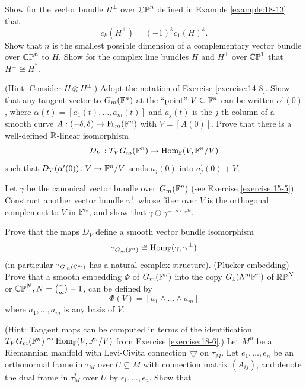 \begin{enumerate}[\theexercise.1]
  \NewItem Show for the vector bundle ${H}^{ \bot  }$ over ${\mathbb{{CP}}}^{n}$ defined in Example \ref{example:18-13} that
    \[
      {c}_{k}( {H}^{ \bot  })  = {(-1) }^{k}{c}_{1}{( H) }^{k}.
    \]
    Show that $n$ is the smallest possible dimension of a complementary vector bundle over ${\mathbb{{CP}}}^{n}$ to $H$.
  \NewItem Show for the complex line bundles $H$ and ${H}^{ \bot  }$ over ${\mathbb{{CP}}}^{1}$ that ${H}^{ \bot  } \cong  {H}^*$. \par(Hint: Consider $H \otimes  {H}^{ \bot  }$.)
  \NewItem Adopt the notation of Exercise \ref{exercise:14-8}. Show that any tangent vector to ${G}_{m}( {\mathbb{F}}^{n})$ at the ``point'' $V \subseteq  {\ensuremath{\mathbb{F}}}^{n}$ can be written ${\alpha }^{\prime }( 0)$, where $\alpha ( t)  = [  {{a}_{1}( t),\ldots,{a}_{m}( t) }]$ and ${a}_{j}( t)$ is the $j$-th column of a smooth curve $A : ( {-\delta,\delta })  \rightarrow  {\ensuremath{\mathrm{Fr}}}_{m}( {\mathbb{F}}^{n})$ with $V = [  {A( 0) }]$. Prove that there is a well-defined ${\mathbb{R}}$-linear isomorphism
    \[
      {D}_{V} : {T}_{V}{G}_{m}( {\mathbb{F}}^{n})  \rightarrow  {\ensuremath{\mathrm{Hom}}}_{\mathbb{F}}( {V,{\mathbb{F}}^{n}/V})
    \]
    such that ${D}_{V}( {{\alpha }^{\prime }( 0) })\colon V \rightarrow  {\ensuremath{\mathbb{F}}}^{n}/V$ sends ${a}_{j}( 0)$ into ${a}_{j}^{\prime }( 0)  + V$.\par
    Let $\gamma$ be the canonical vector bundle over ${G}_{m}( {\mathbb{F}}^{n})$ (see Exercise \ref{exercise:15-5}). Construct another vector bundle ${\gamma }^{ \bot  }$ whose fiber over $V$ is the orthogonal complement to $V$ in ${\mathbb{F}}^{n}$, and show that $\gamma  \oplus  {\gamma }^{ \bot  } \cong  {\varepsilon }^{n}$.\par
    Prove that the maps ${D}_{V}$ define a smooth vector bundle isomorphism
    \[
      {\tau }_{{G}_{m}( {\mathbb{F}}^{n}) } \cong  {\ensuremath{\mathrm{Hom}}}_{\mathbb{F}}( {\gamma,{\gamma }^{ \bot  }})
    \]
    (in particular ${\tau }_{{G}_{m}( {\mathbb{C}}^{m}) }$ has a natural complex structure).
  \NewItem (Pl\"ucker embedding) Prove that a smooth embedding $\Phi$ of ${G}_{m}( {\mathbb{F}}^{n})$ into the copy ${G}_{1}( {{\Lambda }^{m}{\mathbb{F}}^{n}})$ of ${\mathbb{{RP}}}^{N}$ or ${\mathbb{{CP}}}^{N},N = \binom{n}{m} - 1$, can be defined by
    \[
      \Phi ( V)  = [  {{a}_{1} \land  \ldots  \land  {a}_{m}}]
    \]
    where ${a}_{1},\ldots,{a}_{m}$ is any basis of $V$.
    \par(Hint: Tangent maps can be computed in terms of the identification ${T}_{V}{G}_{m}( {\mathbb{F}}^{n})  \cong  {\ensuremath{\mathrm{Hom}}}_{\mathbb{F}}( {V,{\mathbb{F}}^{n}/V})$ from Exercise \ref{exercise:18-6}.)
  \newchap[19]
  \NewItem Let ${M}^{n}$ be a Riemannian manifold with Levi-Civita connection $\bigtriangledown$ on ${\tau }_{M}$. Let ${e}_{1},\ldots,{e}_{n}$ be an orthonormal frame in ${\tau }_{M}$ over $U \subseteq  M$ with connection matrix $( {A}_{ij})$, and denote the dual frame in ${\tau }_{M}^*$ over $U$ by ${\epsilon }_{1},\ldots,{\epsilon }_{n}$. Show that

\end{enumerate}
